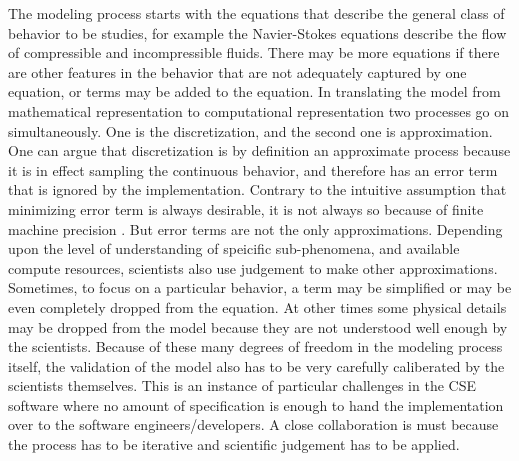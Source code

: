 The modeling process starts with the equations that describe the
general class of behavior to be studies, for example the Navier-Stokes
equations describe the flow of compressible and incompressible
fluids. There may be more equations if there are other features in the
behavior that are not adequately captured by one equation, or terms
may be added to the equation. In translating the model from
mathematical representation to computational representation two
processes go on simultaneously. One is the discretization, and the
second one is approximation. One can argue that discretization is by
definition an approximate process because it is in effect sampling the
continuous behavior, and therefore has an error term that is ignored
by the implementation. Contrary to the intuitive assumption that
minimizing error term is always desirable, it is not always so because
of finite machine precision \cite{}. But error terms are not the only
approximations. Depending upon the level of understanding of speicific
sub-phenomena, and available compute resources, scientists also 
use judgement to make other approximations. Sometimes, to focus on a
particular behavior, a term may be simplified or may be even completely
dropped from the equation. At other times some physical details may be dropped
from the model because they are not understood well enough by the
scientists. Because of these many degrees of freedom in the modeling
process itself, the validation of the model also has to be very
carefully caliberated by the scientists themselves. This is an
instance of particular challenges in the CSE software where no amount
of specification is enough to hand the implementation over to the
software engineers/developers. A close collaboration is must because
the process has to be iterative and scientific judgement has to be
applied. 





 
